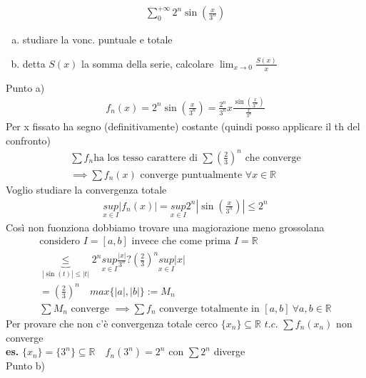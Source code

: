 \documentclass[a4paper, oneside]{article}
\begin{document}
\begin{example}
  \begin{gather*}
    \sum_0^{+\infty} 2^n \sin(\frac{x}{3^n})
  \end{gather*}

  \begin{enumerate}[a)]
    \item studiare la vonc. puntuale e totale
    \item detta $S(x)$ la somma della serie, calcolare $\lim_{x \to 0} \frac{S(x)}{x}$
  \end{enumerate}
  Punto a)
  \begin{gather*}
    f_n(x) = 2^n \sin(\frac{x}{3^n}) = \frac{2^n}{3^n} x \frac{\sin(\frac{x}{3^n})}{\frac{x}{3^n}}    
  \end{gather*}
  Per x fissato ha segno (definitivamente) costante (quindi posso applicare il th del confronto)
  \begin{gather*}
    \sum f_n \text{ha los tesso carattere di } \sum (\frac{2}{3})^n \text{ che converge} \\
    \implies \sum f_n(x) \text{ converge puntualmente } \forall x \in \mathbb{R}
  \end{gather*}
  Voglio studiare la convergenza totale 
  \begin{gather*}
    \underset{x \in I}{sup} |f_n(x)| = \underset{x \in I}{sup} 2^n |\sin(\frac{x}{3^n})| \leq 2^n
  \end{gather*}
  Così non fuonziona dobbiamo trovare una magiorazione meno grossolana
  \begin{gather*}
    \text{considero } I = [a,b] \text{ invece che come prima } I = \mathbb{R}\\
    \underbrace{\leq}_{|\sin(t)| \leq |t|} 2^n \underset{x \in I}{sup} \frac{|x|}{3^n} ? (\frac{2}{3})^n \underset{x \in I}{sup} |x| \\
    = (\frac{2}{3})^n \quad max\{|a|, |b|\} := M_n \\
    \sum M_n \text{ converge } \implies \sum f_n \text{ converge totalmente in } [a,b] \ \forall a,b \in \mathbb{R}
  \end{gather*}
  Per provare che non c'è convergenza totale cerco $\{x_n\} \subseteq \mathbb{R}$ $t.c.$ $\sum f_n(x_n)$ non converge\\
  \textbf{es.} $\{x_n\} = \{3^n\} \subseteq\mathbb{R} \quad f_n(3^n) = 2^n$ con $\sum 2^n$ diverge 
  \hfil\\
  Punto b)
  \begin{observation}
    \begin{gather*}

\end{gather*}
\end{observation}
\end{example}
\end{document}
